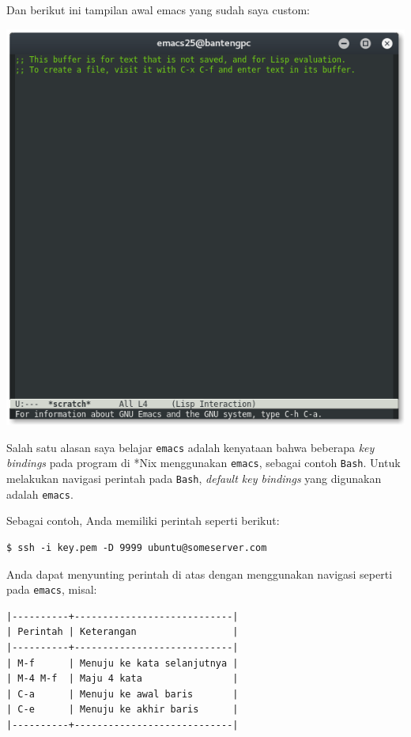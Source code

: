 \documentclass{article}
\begin{document}
Dan berikut ini tampilan awal emacs yang sudah saya custom:

\vspace{12pt}

\includegraphics[scale=0.5]{images/emacs2.png} 

\vspace{12pt}

Salah satu alasan saya belajar \verb=emacs= adalah kenyataan
bahwa beberapa \emph{key bindings} pada program di *Nix 
menggunakan \verb=emacs=, sebagai contoh \verb=Bash=. Untuk
melakukan navigasi perintah pada \verb=Bash=, 
\emph{default key bindings} yang digunakan adalah \verb=emacs=.

Sebagai contoh, Anda memiliki perintah seperti berikut:

\begin{verbatim}
$ ssh -i key.pem -D 9999 ubuntu@someserver.com
\end{verbatim}

Anda dapat menyunting perintah di atas dengan menggunakan
navigasi seperti pada \verb=emacs=, misal:

\begin{verbatim}
|----------+----------------------------|
| Perintah | Keterangan                 |
|----------+----------------------------|
| M-f      | Menuju ke kata selanjutnya |
| M-4 M-f  | Maju 4 kata                |
| C-a      | Menuju ke awal baris       |
| C-e      | Menuju ke akhir baris      |
|----------+----------------------------|
\end{verbatim}
\end{document}
